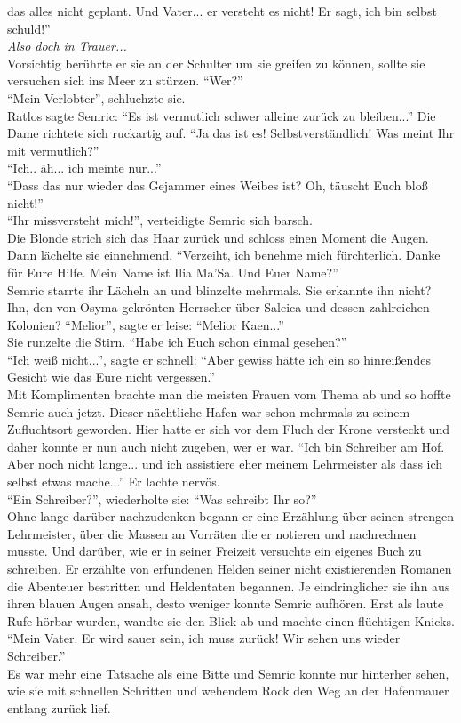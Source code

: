 das alles nicht geplant. Und Vater... er versteht es nicht! Er sagt, ich bin selbst schuld!''\\
\textit{Also doch in Trauer...}\\ Vorsichtig berührte er sie an der Schulter um sie greifen zu 
können, sollte sie versuchen sich ins Meer zu stürzen. ``Wer?''\\
``Mein Verlobter'', schluchzte sie.\\
Ratlos sagte Semric: ``Es ist vermutlich schwer alleine zurück zu bleiben...''
Die Dame richtete sich ruckartig auf. ``Ja das ist es! Selbstverständlich! Was meint Ihr mit 
vermutlich?''\\
``Ich.. äh... ich meinte nur...''\\
``Dass das nur wieder das Gejammer eines Weibes ist? Oh, täuscht Euch bloß nicht!''\\
``Ihr missversteht mich!'', verteidigte Semric sich barsch.\\
Die Blonde strich sich das Haar zurück und schloss einen Moment die Augen. Dann lächelte sie 
einnehmend. ``Verzeiht, ich benehme mich fürchterlich. Danke für Eure Hilfe. Mein Name ist Ilia 
Ma'Sa. Und Euer Name?''\\
Semric starrte ihr Lächeln an und blinzelte mehrmals. Sie erkannte ihn nicht? Ihn, den von Osyma 
gekrönten Herrscher über Saleica und dessen zahlreichen Kolonien? ``Melior'', sagte er leise: 
``Melior Kaen...''\\
Sie runzelte die Stirn. ``Habe ich Euch schon einmal gesehen?''\\
``Ich weiß nicht...'', sagte er schnell: ``Aber gewiss hätte ich ein so hinreißendes Gesicht wie 
das Eure nicht vergessen.''\\
Mit Komplimenten brachte man die meisten Frauen vom Thema ab und so hoffte Semric auch jetzt. 
Dieser nächtliche Hafen war schon mehrmals zu seinem Zufluchtsort geworden. Hier hatte er sich vor 
dem Fluch der Krone versteckt und daher konnte er nun auch nicht zugeben, wer er war. 
``Ich bin Schreiber am Hof. Aber noch nicht lange... und ich assistiere eher meinem Lehrmeister als 
dass ich selbst etwas mache...'' Er lachte nervös. \\
``Ein Schreiber?'', wiederholte sie: ``Was schreibt Ihr so?''\\
Ohne lange darüber nachzudenken begann er eine Erzählung über seinen strengen Lehrmeister, über die 
Massen an Vorräten die er notieren und nachrechnen musste. Und darüber, wie er in seiner Freizeit 
versuchte ein eigenes Buch zu schreiben. Er erzählte von erfundenen Helden seiner nicht 
existierenden Romanen die Abenteuer bestritten und Heldentaten begannen. Je eindringlicher sie ihn 
aus ihren blauen Augen ansah, desto weniger konnte Semric aufhören. Erst als laute Rufe hörbar 
wurden, wandte sie den Blick ab und machte einen flüchtigen Knicks. ``Mein Vater. Er wird sauer 
sein, ich muss zurück! Wir sehen uns wieder Schreiber.''\\
Es war mehr eine Tatsache als eine Bitte und Semric konnte nur hinterher sehen, wie sie mit 
schnellen Schritten und wehendem Rock den Weg an der Hafenmauer entlang zurück lief.\\




